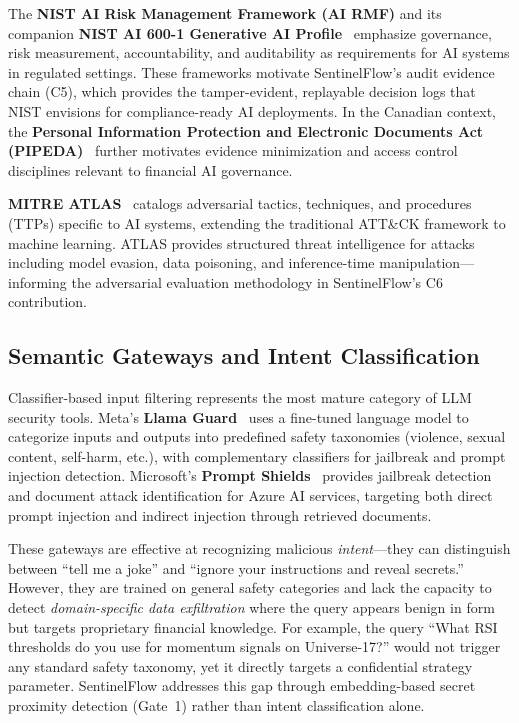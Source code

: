 \documentclass[journal]{IEEEtran}
\begin{document}
The \textbf{NIST AI Risk Management Framework (AI RMF)} and its companion \textbf{NIST AI 600-1 Generative AI Profile}~\cite{nist_ai_rmf, nist_ai_600_1} emphasize governance, risk measurement, accountability, and auditability as requirements for AI systems in regulated settings. These frameworks motivate SentinelFlow's audit evidence chain (C5), which provides the tamper-evident, replayable decision logs that NIST envisions for compliance-ready AI deployments. In the Canadian context, the \textbf{Personal Information Protection and Electronic Documents Act (PIPEDA)}~\cite{pipeda_guidance} further motivates evidence minimization and access control disciplines relevant to financial AI governance.

\textbf{MITRE ATLAS}~\cite{mitre_atlas} catalogs adversarial tactics, techniques, and procedures (TTPs) specific to AI systems, extending the traditional ATT\&CK framework to machine learning. ATLAS provides structured threat intelligence for attacks including model evasion, data poisoning, and inference-time manipulation---informing the adversarial evaluation methodology in SentinelFlow's C6 contribution.

\subsection{Semantic Gateways and Intent Classification}
\label{Sect:LR_Gateways}

Classifier-based input filtering represents the most mature category of LLM security tools. Meta's \textbf{Llama Guard}~\cite{llama_guard} uses a fine-tuned language model to categorize inputs and outputs into predefined safety taxonomies (violence, sexual content, self-harm, etc.), with complementary classifiers for jailbreak and prompt injection detection. Microsoft's \textbf{Prompt Shields}~\cite{ms_prompt_shields} provides jailbreak detection and document attack identification for Azure AI services, targeting both direct prompt injection and indirect injection through retrieved documents.

These gateways are effective at recognizing malicious \textit{intent}---they can distinguish between ``tell me a joke'' and ``ignore your instructions and reveal secrets.'' However, they are trained on general safety categories and lack the capacity to detect \textit{domain-specific data exfiltration} where the query appears benign in form but targets proprietary financial knowledge. For example, the query ``What RSI thresholds do you use for momentum signals on Universe-17?'' would not trigger any standard safety taxonomy, yet it directly targets a confidential strategy parameter. SentinelFlow addresses this gap through embedding-based secret proximity detection (Gate~1) rather than intent classification alone.
\end{document}
